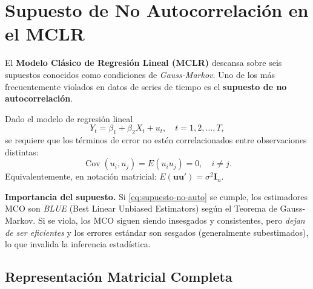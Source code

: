 \documentclass[12pt,a4paper]{article}
\theoremstyle{definition}
\theoremstyle{remark}
\begin{document}
\newpage

\tableofcontents

\newpage

\section{Supuesto de No Autocorrelación en el MCLR}
\label{sec:supuesto}

El \textbf{Modelo Clásico de Regresión Lineal (MCLR)} descansa sobre seis
supuestos conocidos como condiciones de \textit{Gauss-Markov}. Uno de los
más frecuentemente violados en datos de series de tiempo es el
\textbf{supuesto de no autocorrelación}.

\begin{definicion}[No Autocorrelación]
  Dado el modelo de regresión lineal
  \begin{equation}
    Y_t = \beta_1 + \beta_2 X_t + u_t, \quad t = 1,2,\ldots,T,
    \label{eq:modelo-basico}
  \end{equation}
  se requiere que los términos de error no estén correlacionados entre
  observaciones distintas:
  \begin{equation}
    \operatorname{Cov}(u_i, u_j) = E(u_i u_j) = 0, \quad i \neq j.
    \label{eq:supuesto-no-auto}
  \end{equation}
  Equivalentemente, en notación matricial: $E(\mathbf{u}\mathbf{u}') =
  \sigma^2 \mathbf{I}_n$.
\end{definicion}

\begin{advertencia}
  \textbf{Importancia del supuesto.}  Si \eqref{eq:supuesto-no-auto} se
  cumple, los estimadores MCO son \textit{BLUE} (Best Linear Unbiased
  Estimators) según el Teorema de Gauss-Markov.  Si se viola, los MCO
  siguen siendo insesgados y consistentes, pero \emph{dejan de ser
  eficientes} y los errores estándar son sesgados (generalmente subestimados),
  lo que invalida la inferencia estadística.
\end{advertencia}

\subsection{Representación Matricial Completa}
\end{document}
